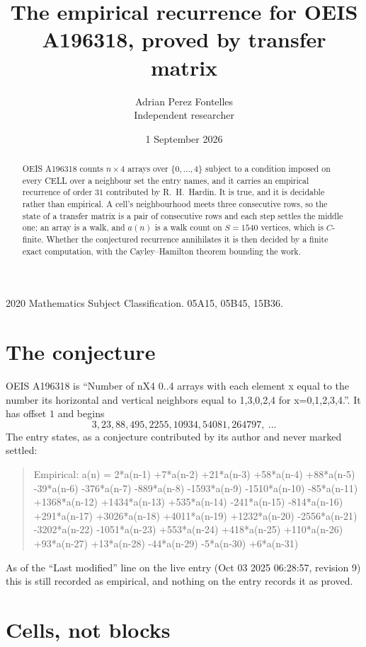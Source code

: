 \documentclass[11pt,a4paper]{article}
\title{The empirical recurrence for OEIS A196318, proved by transfer matrix}
\author{Adrian Perez Fontelles\\ \small Independent researcher}
\date{1 September 2026}
\theoremstyle{plain}
\theoremstyle{definition}
\begin{document}
\maketitle

\begin{abstract}
OEIS A196318 counts $n\times4$ arrays over $\{0,\dots,4\}$ subject to a condition imposed on
every CELL over a neighbour set the entry names, and it carries an empirical recurrence of
order $31$ contributed by R.~H.~Hardin. It is true, and it is decidable rather than
empirical. A cell's neighbourhood meets three consecutive rows, so the state of a transfer
matrix is a pair of consecutive rows and each step settles the middle one; an array is a
walk, and $a(n)$ is a walk count on $S=1540$ vertices, which is $C$-finite. Whether the
conjectured recurrence annihilates it is then decided by a finite exact computation, with the
Cayley--Hamilton theorem bounding the work.
\end{abstract}

\noindent\small 2020 Mathematics Subject Classification. 05A15, 05B45, 15B36.\normalsize

\section{The conjecture}

OEIS A196318 is ``Number of nX4 0..4 arrays with each element x equal to the number its horizontal and vertical neighbors equal to 1,3,0,2,4 for x=0,1,2,3,4.''. It has offset $1$ and begins
\[
3, 23, 88, 495, 2255, 10934, 54081, 264797,\ \dots
\]
The entry states, as a conjecture contributed by its author and never marked settled:
\begin{quote}
Empirical: a(n) = 2*a(n-1) +7*a(n-2) +21*a(n-3) +58*a(n-4) +88*a(n-5) -39*a(n-6) -376*a(n-7) -889*a(n-8) -1593*a(n-9) -1510*a(n-10) -85*a(n-11) +1368*a(n-12) +1434*a(n-13) +535*a(n-14) -241*a(n-15) -814*a(n-16) +291*a(n-17) +3026*a(n-18) +4011*a(n-19) +1232*a(n-20) -2556*a(n-21) -3202*a(n-22) -1051*a(n-23) +553*a(n-24) +418*a(n-25) +110*a(n-26) +93*a(n-27) +13*a(n-28) -44*a(n-29) -5*a(n-30) +6*a(n-31)
\end{quote}
As of the ``Last modified'' line on the live entry (Oct 03 2025 06:28:57, revision 9) this is still
recorded as empirical, and nothing on the entry records it as proved.

\section{Cells, not blocks}
\end{document}

